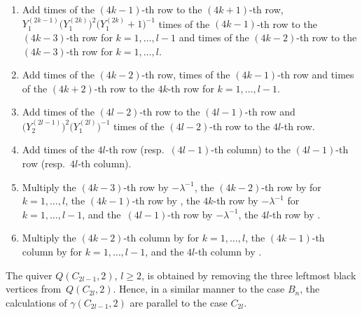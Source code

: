 \documentclass[pdftex]{sigma}
\numberwithin{equation}{section}
\begin{document}
	\begin{enumerate}\itemsep=0pt
		\item Add  times of the $(4k-1)$-th row to the $(4k+1)$-th row, $Y_1^{(2k-1)}\bigl(Y_1^{(2k)}\bigr)^2\bigl(Y_1^{(2k)}+1\bigr)^{-1}$ times of the $(4k-1)$-th row to the $(4k-3)$-th row for $k=1,\dots,l-1$ and  times of the $(4k-2)$-th row to the $(4k-3)$-th row for $k=1,\dots,l$.
		
\item Add  times of the $(4k-2)$-th row,  times of the $(4k-1)$-th row and  times of the $(4k+2)$-th row to the $4k$-th row for $k=1,\dots, l-1$.
		
\item Add  times of the $(4l-2)$-th row to the $(4l-1)$-th row and $\bigl(Y_2^{(2l-1)}\bigr)^2\bigl(Y_1^{(2l)}\bigr)^{-1}$ times of the $(4l-2)$-th row to the $4l$-th row.
		
\item Add  times of the $4l$-th row (resp.\ $(4l-1)$-th column) to the $(4l-1)$-th row (resp.\ $4l$-th column).
		
\item Multiply the $(4k-3)$-th row by $-\lambda^{-1}$, the $(4k-2)$-th row by  for $k=1,\dots,l$, the $(4k-1)$-th row by , the $4k$-th row by $-\lambda^{-1}$ for $k=1,\dots,l-1$, and the~${(4l-1)}$-th row by $-\lambda^{-1}$, the $4l$-th row by .
		
\item Multiply the $(4k-2)$-th column by  for $k=1,\dots,l$, the $(4k-1)$-th column by  for $k=1,\dots,l-1$, and the $4l$-th column by .
	\end{enumerate}
	
The quiver $Q(C_{2l-1},2)$, $l\geq2$, is obtained by removing the three leftmost black vertices from~$Q(C_{2l},2)$.
Hence, in a similar manner to the case $B_n$, the calculations of $\gamma(C_{2l-1},2)$ are parallel to the case $C_{2l}$.
\end{document}

